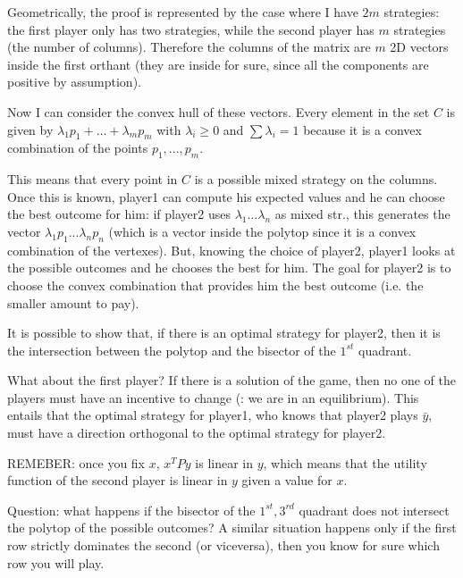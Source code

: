 
\noindent Geometrically, the proof is represented by the case where I have $2m$ 
strategies: the first player only has two strategies, while the second player 
has $m$ strategies (the number of columns). Therefore the columns of the matrix 
are $m$ 2D vectors inside the first orthant (they are inside for sure, since all 
the components are positive by assumption).

\noindent Now I can consider the convex hull of these vectors. Every element in 
the set $C$ is given by $\lambda_1p_1 + ... + \lambda_mp_m$ with $\lambda_i 
\geq 0$ and $\sum{\lambda_i} = 1$ because it is a convex combination of the 
points $p_1,...,p_m$.

\noindent This means that every point in $C$ is a possible mixed strategy on the 
columns. Once this is known, player1 can compute his expected values and he can 
choose the best outcome for him: if player2 uses $\lambda_1...\lambda_n$ as 
mixed str., this generates the vector $\lambda_1p_1...\lambda_np_n$ (which is a 
vector inside the polytop since it is a convex combination of the vertexes).
But, knowing the choice of player2, player1 looks at the possible outcomes 
and he chooses the best for him. The goal for player2 is to choose the convex 
combination that provides him the best outcome (i.e. the smaller amount to pay).

\noindent It is possible to show that, if there is an optimal strategy for 
player2, then it is the intersection between the polytop and the bisector of the 
$1^{st}$ quadrant.

\noindent What about the first player? If there is a solution of the game, then 
no one of the players must have an incentive to change (: we are in an 
equilibrium). This entails that the optimal strategy for player1, who knows that 
player2 plays $\bar{y}$, must have a direction orthogonal to the optimal 
strategy for player2.

\noindent REMEBER: once you fix $x$, $x^TPy$ is linear in $y$, which means that 
the utility function of the second player is linear in $y$ given a 
value for $x$.

\noindent Question: what happens if the bisector of the $1^{st},3^{rd}$ 
quadrant does not intersect the polytop of the possible outcomes?
A similar situation happens only if the first row strictly dominates
the second (or viceversa), then you know for sure which row you will
play.

% 
